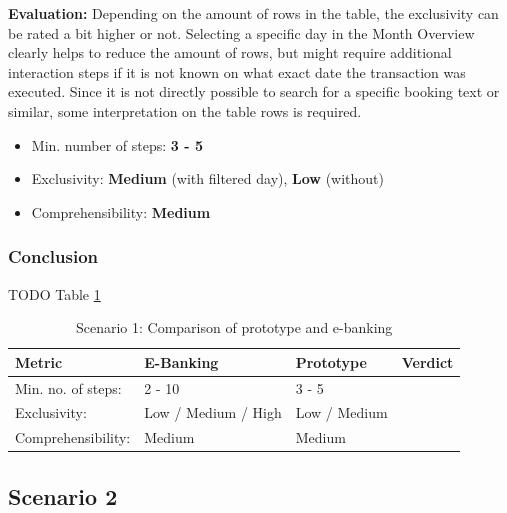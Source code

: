 \textbf{Evaluation:} Depending on the amount of rows in the table, the exclusivity can be rated a bit higher or not. Selecting a specific day in the Month Overview clearly helps to reduce the amount of rows, but might require additional interaction steps if it is not known on what exact date the transaction was executed. Since it is not directly possible to search for a specific booking text or similar, some interpretation on the table rows is required.
\begin{itemize}[noitemsep,nolistsep]
	\item Min. number of steps: \textbf{3 - 5}
	\item Exclusivity: \textbf{Medium} (with filtered day), \textbf{Low} (without)
	\item Comprehensibility: \textbf{Medium}
\end{itemize}



\subsubsection{Conclusion}

TODO Table \ref{tbl:scenarioonecomparison}

\begin{table}[t]
	\begin{center}
		\begin{tabular}{ | p{3.2cm} | p{3.8cm} | p{3.5cm} | p{2.5cm} | }
			\hline
			\textbf{Metric} & \textbf{E-Banking} & \textbf{Prototype} & \textbf{Verdict} \\
			\hline
				Min. no. of steps: & 2 - 10 & 3 - 5 &  \\
			\hline
				Exclusivity: & Low / Medium / High & Low / Medium &  \\
			\hline
				Comprehensibility: & Medium & Medium &  \\
			\hline
		\end{tabular}
		\caption{Scenario 1: Comparison of prototype and e-banking}
		\label{tbl:scenarioonecomparison}
	\end{center}
\end{table}



\subsection{Scenario 2}

